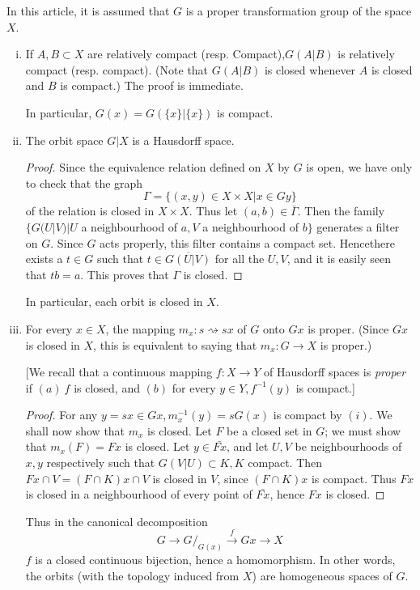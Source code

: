 In this article, it is assumed that $G$ is a proper transformation
group of the space $X$. 
\begin{enumerate}[(i)]
\item If $A, B \subset X$ are relatively compact (resp. Compact),$G(A
  | B)$ is relatively compact (resp. compact). (Note that $G(A | B)$
  is closed whenever $A$ is closed and $B$ is compact.) The proof is
  immediate. 

In particular, $G(x) = G(\{ x \}|\{ x \})$ is compact.

\item The orbit space $G | X$ is a Hausdorff space.
  \begin{proof}
    Since the equivalence relation defined on $X$ by $G$ is open, we
    have only to check that the graph 
  $$
    \Gamma = \{(x, y)\in X \times X |  x \in Gy \}
  $$
    of the relation is closed in $X \times X$. Thus let $(a, b)\in
    \bar{\Gamma}$. Then the family $\{G(U | V) | U $ a neighbourhood of
    $a, V$ a neighbourhood of $b \}$ generates a filter on $G$. Since $G$
    acts properly, this filter contains a compact set. Hence\pageoriginale there exists
    a $t \in G$ such that $t \in \overline{G(U |V)}$ for all the $U, V$,
    and it is easily seen that $tb = a$. This proves that $\Gamma$ is
    closed. 
  \end{proof}
  In particular, each orbit is closed in $X$.

\item For every $x \in X$, the mapping $m_x : s \rightsquigarrow sx$
  of $G$ onto $Gx$ is proper. (Since $Gx$ is closed in $X$, this is
  equivalent to saying that $m_x : G \rightarrow X$ is proper.) 

[We recall that a continuous mapping $f :X \to Y$ of Hausdorff spaces
  is \textit{ proper } if $(a)~f$  is closed, and $(b)$ for every $y
  \in Y, f^{-1}(y)$ is compact.] 
\begin{proof}
  For any $y = sx \in Gx, m_x^{-1}(y) = sG(x)$ is compact by $(i)$. We
  shall now show that $m_x$ is closed. Let $F$ be a closed set in $G$;
  we must show that $m_x(F)=Fx$ is closed. Let $y \in \bar{Fx}$, and let
  $U, V$ be neighbourhoods of $x, y$ respectively such that $G(V
  |U)\subset K, K$ compact. Then $F x \cap V=(F \cap K)x \cap V$  is
  closed in $V$, since $(F \cap K)x$ is compact. Thus $Fx$ is closed in
  a neighbourhood of every point of $\bar{Fx}$, hence $Fx$ is closed. 
\end{proof}
Thus in the canonical decomposition
$$
G \to G/_{G(x)} \xrightarrow{f}Gx \to X
$$
$f$ is a closed continuous bijection, hence a homomorphism. In other
words, the orbits (with the topology induced from $X$) are homogeneous
spaces of $G$.  


\end{enumerate}
